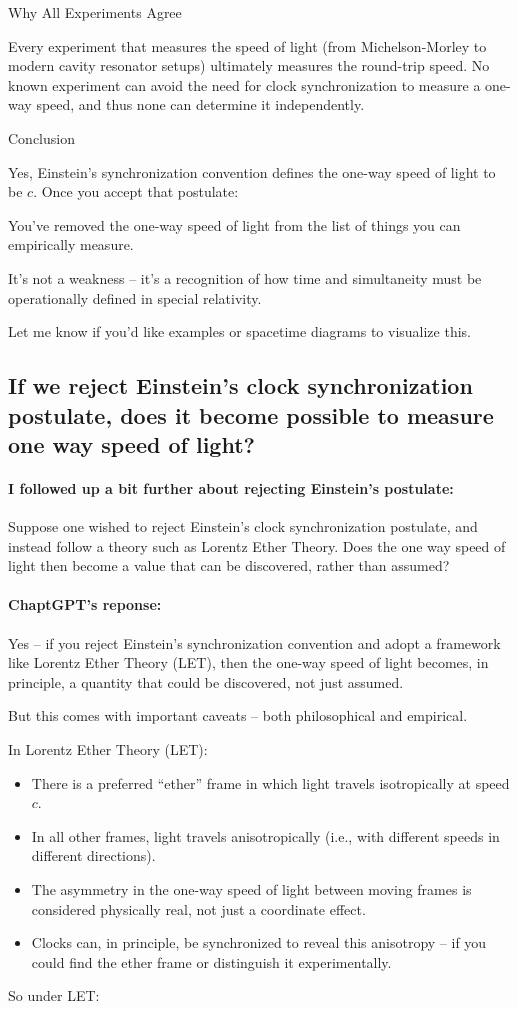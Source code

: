 \documentclass[a4paper]{article}
\theoremstyle{plain}
\theoremstyle{definition}
\begin{document}
Why All Experiments Agree

Every experiment that measures the speed of light (from
Michelson-Morley to modern cavity resonator setups) ultimately
measures the round-trip speed.  No known experiment can avoid the need
for clock synchronization to measure a one-way speed, and thus none
can determine it independently.

Conclusion

Yes, Einstein's synchronization convention defines the one-way speed
of light to be $c$.  Once you accept that postulate:

You've removed the one-way speed of light from the list of things you
can empirically measure.

It's not a weakness -- it's a recognition of how time and simultaneity
must be operationally defined in special relativity.

Let me know if you'd like examples or spacetime diagrams to visualize
this.


\subsection{If we reject Einstein's clock synchronization postulate, does it become possible to measure one way speed of light?}

\paragraph{I followed up a bit further about rejecting Einstein's postulate:}

Suppose one wished to reject Einstein's clock synchronization
postulate, and instead follow a theory such as Lorentz Ether Theory.
Does the one way speed of light then become a value that can be
discovered, rather than assumed?

\paragraph{ChaptGPT's reponse:}

Yes -- if you reject Einstein's synchronization convention and adopt a
framework like Lorentz Ether Theory (LET), then the one-way speed of
light becomes, in principle, a quantity that could be discovered, not
just assumed.

But this comes with important caveats -- both philosophical and
empirical.

In Lorentz Ether Theory (LET):
\begin{itemize}
\item There is a preferred ``ether'' frame in which light travels
  isotropically at speed $c$.
\item In all other frames, light travels anisotropically (i.e., with
  different speeds in different directions).
\item The asymmetry in the one-way speed of light between moving
  frames is considered physically real, not just a coordinate effect.
\item Clocks can, in principle, be synchronized to reveal this
  anisotropy -- if you could find the ether frame or distinguish it
  experimentally.
\end{itemize}
So under LET:
\end{document}
